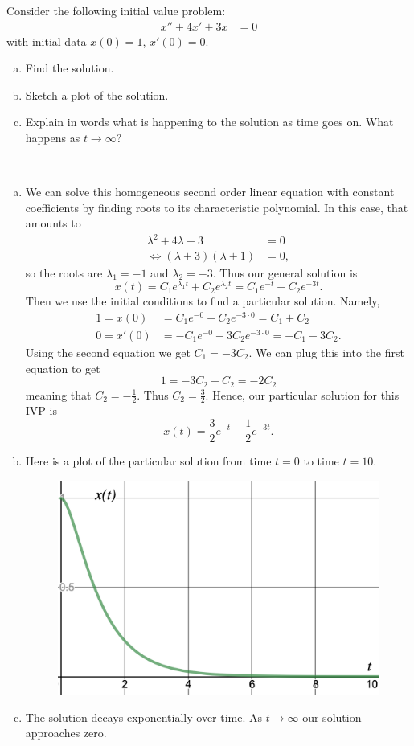 \documentclass[12pt]{article} %
\begin{document}
\newpage
\begin{problem}
Consider the following initial value problem:
\begin{align*}
    x''+4x'+3x&=0
\end{align*}
with initial data $x(0)=1$, $x'(0)=0$.  
\begin{enumerate}[(a)]
    \item Find the solution.
    \item Sketch a plot of the solution.
    \item Explain in words what is happening to the solution as time goes on. What happens as $t\to \infty$?
\end{enumerate}
\end{problem}
\begin{solution}~
\begin{enumerate}[(a)]
    \item We can solve this homogeneous second order linear equation with constant coefficients by finding roots to its characteristic polynomial. In this case, that amounts to
    \begin{align*}
        \lambda^2+4\lambda+3&=0\\
        \iff (\lambda +3)(\lambda+1)&=0,
    \end{align*}
    so the roots are $\lambda_1=-1$ and $\lambda_2=-3$.  Thus our general solution is
    \[
    x(t)=C_1 e^{\lambda_1 t}+C_2e^{\lambda_2 t}=C_1 e^{-t}+C_2e^{-3t}.
    \]
    Then we use the initial conditions to find a particular solution. Namely,
    \begin{align*}
        1=x(0)&=C_1e^{-0}+C_2e^{-3\cdot 0}=C_1+C_2\\
        0=x'(0)&=-C_1e^{-0}-3C_2e^{-3\cdot 0}=-C_1-3C_2.
    \end{align*}
    Using the second equation we get $C_1=-3C_2$. We can plug this into the first equation to get
    \[
    1=-3C_2+C_2=-2C_2
    \]
    meaning that $C_2=-\frac{1}{2}$. Thus $C_2=\frac{3}{2}$. Hence, our particular solution for this IVP is
    \[
    x(t)=\frac{3}{2} e^{-t}-\frac{1}{2}e^{-3t}.
    \]
    \item Here is a plot of the particular solution from time $t=0$ to time $t=10$.
    \begin{figure}[H]
        \centering
        \includegraphics[width=.7\textwidth]{Homework_3/desmos-graph(19).png}
    \end{figure}
    \item The solution decays exponentially over time.  As $t\to \infty$ our solution approaches zero.
\end{enumerate}
\end{solution}
\end{document}
